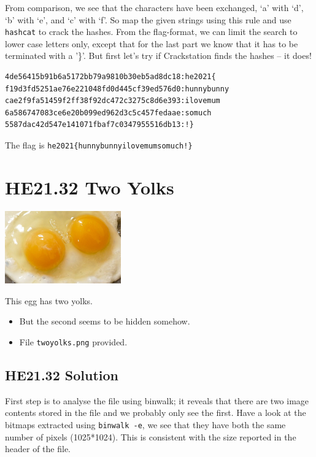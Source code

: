 \documentclass[english,a4paper,nols,noindent]{tufte-handout}
\begin{document}
From comparison, we see that the characters have been exchanged, `a' with `d',
`b' with `e', and `c' with `f'.  So map the given strings using this rule and
use \verb+hashcat+ to crack the hashes.  From the flag-format, we can limit the
search to lower case letters only, except that for the last part we know that
it has to be terminated with a '\}'.  But first let's try if Crackstation finds
the hashes -- it does!

\begin{verbatim} 
4de56415b91b6a5172bb79a9810b30eb5ad8dc18:he2021{
f19d3fd5251ae76e221048fd0d445cf39ed576d0:hunnybunny
cae2f9fa51459f2ff38f92dc472c3275c8d6e393:ilovemum
6a586747083ce6e20b099ed962d3c5c457fedaae:somuch
5587dac42d547e141071fbaf7c0347955516db13:!}
\end{verbatim} 

\noindent The flag is \verb+he2021{hunnybunnyilovemumsomuch!}+

\hypertarget{he21.32}{%
\section{HE21.32 Two Yolks}
  \label{he21.32}}
\begin{marginfigure}
    \includegraphics[width=50mm]{images/challenge32.jpg}
\end{marginfigure}

\noindent This egg has two yolks.

\begin{itemize}
\item But the second seems to be hidden somehow.
\item File \verb+twoyolks.png+ provided.
\end{itemize}

\hypertarget{he21.32-solution}{%
\subsection{HE21.32 Solution}\label{he21.32-solution}}

\noindent First step is to analyse the file using binwalk; it reveals that
there are two image contents stored in the file and we probably only see the
first.  Have a look at the bitmaps extracted using \verb+binwalk -e+, we see
that they have both the same number of pixels (1025*1024).  This is consistent
with the size reported in the header of the file.
\end{document}
